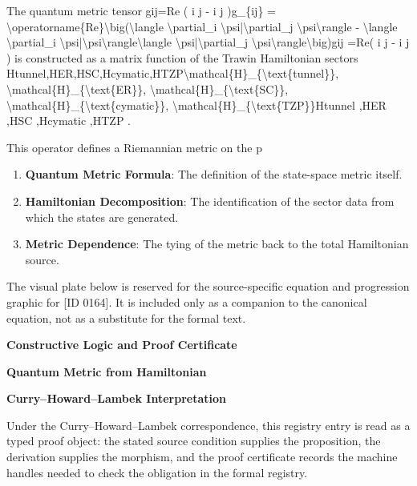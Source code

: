 The quantum metric tensor gij=Re (  i   j  -  i        j  )g\_\{ij\} = \textbackslash{}operatorname\{Re\}\textbackslash{}big(\textbackslash{}langle \textbackslash{}partial\_i \textbackslash{}psi|\textbackslash{}partial\_j \textbackslash{}psi\textbackslash{}rangle - \textbackslash{}langle \textbackslash{}partial\_i \textbackslash{}psi|\textbackslash{}psi\textbackslash{}rangle\textbackslash{}langle \textbackslash{}psi|\textbackslash{}partial\_j \textbackslash{}psi\textbackslash{}rangle\textbackslash{}big)gij =Re(  i    j   -  i         j   ) is constructed as a matrix function of the Trawin Hamiltonian sectors Htunnel,HER,HSC,Hcymatic,HTZP\textbackslash{}mathcal\{H\}\_\{\textbackslash{}text\{tunnel\}\}, \textbackslash{}mathcal\{H\}\_\{\textbackslash{}text\{ER\}\}, \textbackslash{}mathcal\{H\}\_\{\textbackslash{}text\{SC\}\}, \textbackslash{}mathcal\{H\}\_\{\textbackslash{}text\{cymatic\}\}, \textbackslash{}mathcal\{H\}\_\{\textbackslash{}text\{TZP\}\}Htunnel ,HER ,HSC ,Hcymatic ,HTZP .

This operator defines a Riemannian metric on the p
\endgroup

\begin{enumerate}[leftmargin=1.6em,itemsep=6pt,topsep=4pt]
\item \textbf{Quantum Metric Formula}: The definition of the state-space metric itself.
\item \textbf{Hamiltonian Decomposition}: The identification of the sector data from which the states are generated.
\item \textbf{Metric Dependence}: The tying of the metric back to the total Hamiltonian source.
\end{enumerate}

\begingroup\footnotesize\sloppy
The visual plate below is reserved for the source-specific equation and progression graphic for [ID 0164]. It is included only as a companion to the canonical equation, not as a substitute for the formal text.
\par\endgroup
\ifTZPDarkEdition
{}
\fi

\clearpage
\begingroup\tzpsupportsetup
\noindent\textbf{\fontsize{10.8pt}{12.8pt}\selectfont [ID 0164] Constructive Logic and Proof Certificate}\par
\noindent\textbf{\fontsize{10pt}{12pt}\selectfont Quantum Metric from Hamiltonian}\par
\vspace{0.45em}
\begingroup
\footnotesize
\setlength{\parskip}{0.22em}
\setlength{\parindent}{0pt}
\noindent\textbf{Curry--Howard--Lambek Interpretation}\par
Under the Curry--Howard--Lambek correspondence, this registry entry is read as a typed proof
object: the stated source condition supplies the proposition, the derivation supplies the
morphism, and the proof certificate records the machine handles needed to check the obligation
in the formal registry.

